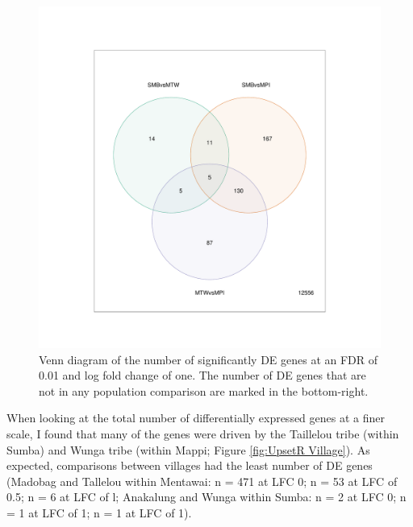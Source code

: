 \documentclass[12pt,a4paper,titlepage,twoside,openright]{book}
\begin{document}
\begin{mainmatter}
{\begin{figure}[htb!]
\centering
\includegraphics[width=\textwidth,height=\textheight,keepaspectratio]{Figures/vennDiagram_allSigDEGenes_pval01_FDR1_dupCor.pdf}
\caption{Venn diagram of the number of significantly DE genes at an FDR of 0.01 and log fold change of one. The number of DE genes that are not in any population comparison are marked in the bottom-right.}
\label{fig:Venn Diagram between Islands}
\end{figure}

When looking at the total number of differentially expressed genes at a finer scale, I found that many of the genes were driven by the Taillelou tribe (within Sumba) and Wunga tribe (within Mappi; Figure \ref{fig:UpsetR Village}). As expected, comparisons between villages had the least number of DE genes (Madobag and Tallelou within Mentawai: n = 471 at LFC 0; n = 53 at LFC of 0.5; n = 6 at LFC of l; Anakalung and Wunga within Sumba: n = 2 at LFC 0; n = 1 at LFC of 1; n = 1 at LFC of 1). 

}
\end{mainmatter}
\end{document}
